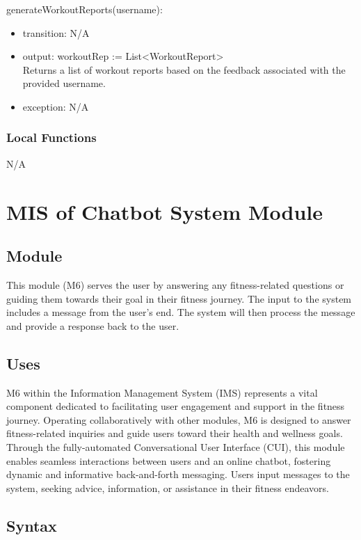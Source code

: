 \documentclass[12pt, titlepage]{article}
\begin{document}
\noindent generateWorkoutReports(username):
\begin{itemize}
\item transition: N/A
\item output: workoutRep := List\textless WorkoutReport\textgreater \\
Returns a list of workout reports based on the feedback associated with the provided username.
\item exception: N/A
\end{itemize}


\subsubsection{Local Functions}
N/A

\section{MIS of Chatbot System Module}

\subsection{Module}
This module (M6) serves the user by answering any fitness-related questions or guiding them towards their goal in their fitness journey. The input to the system includes a message from the user's end. The system will then process the message and provide a response back to the user. 
 

\subsection{Uses}
M6 within the Information Management System (IMS) represents a vital component dedicated to facilitating user engagement and support in the fitness journey. Operating collaboratively with other modules, M6 is designed to answer fitness-related inquiries and guide users toward their health and wellness goals. Through the fully-automated Conversational User Interface (CUI), this module enables seamless interactions between users and an online chatbot, fostering dynamic and informative back-and-forth messaging. Users input messages to the system, seeking advice, information, or assistance in their fitness endeavors.

\subsection{Syntax}
\end{document}
